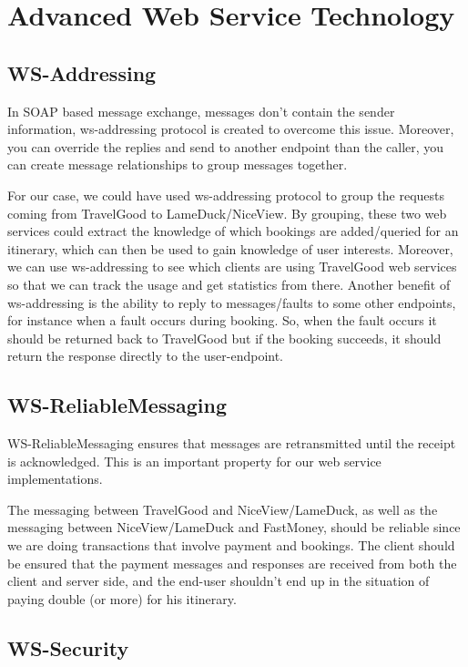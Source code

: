 \section{Advanced Web Service Technology}

\subsection*{WS-Addressing}

In SOAP based message exchange, messages don’t contain the sender information, ws-addressing protocol is created to overcome this issue. Moreover, you can override the replies and send to another endpoint than the caller, you can create message relationships to group messages together.

For our case, we could have used ws-addressing protocol to group the requests coming from TravelGood to LameDuck/NiceView. By grouping, these two web services could extract the knowledge of which bookings are added/queried for an itinerary, which can then be used to gain knowledge of user interests. Moreover, we can use ws-addressing to see which clients are using TravelGood web services so that we can track the usage and get statistics from there. Another benefit of ws-addressing is the ability to reply to messages/faults to some other endpoints, for instance when a fault occurs during booking. So, when the fault occurs it should be returned back to TravelGood but if the booking succeeds, it should return the response directly to the user-endpoint.

\subsection*{WS-ReliableMessaging}

WS-ReliableMessaging ensures that messages are retransmitted until the receipt is acknowledged. This is an important property for our web service implementations. 

The messaging between TravelGood and NiceView/LameDuck, as well as the messaging between NiceView/LameDuck and FastMoney, should be reliable since we are doing transactions that involve payment and bookings. The client should be ensured that the payment messages and responses are received from both the client and server side, and the end-user shouldn’t end up in the situation of paying double (or more) for his itinerary.

\subsection*{WS-Security}

